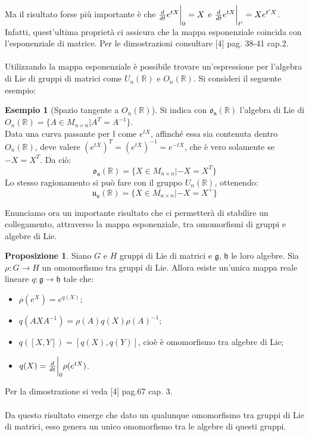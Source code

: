 \documentclass[12pt,a4paper]{report}
\theoremstyle{definition}
\theoremstyle{Theorem}
\newtheorem{Prop}[Def]{Proposizione}
\theoremstyle{definition}
\newtheorem{Ex}[Def]{Esempio}
\theoremstyle{definition}
\theoremstyle{definition}
\begin{document}
Ma il risultato forse più importante è che ${d\over dt}e^{tX}\bigg{\rvert}_0=X$ e ${d\over dt}e^{tX}\bigg{\rvert}_{t'}=Xe^{t'X}$.\\
Infatti, quest'ultima proprietà ci assicura che la mappa esponenziale coincida con l'esponenziale di matrice.
Per le dimostrazioni consultare [4] pag. 38-41 cap.2.\\
\\
Utilizzando la mappa esponenziale è possibile trovare un'espressione per l'algebra di Lie di gruppi di matrici come $U_n(\mathbb{R})$ e $O_n(\mathbb{R})$. Si consideri il seguente esempio:
\begin{Ex}[Spazio tangente a $O_n(\mathbb{R})$]
	Si indica con $\mathfrak{o_n(\mathbb{R})}$ l'algebra di Lie di $O_n(\mathbb{R})=\{A\in M_{n\times n}|A^T=A^{-1}\}$.\\
	Data una curva passante per $\mathbb{I}$ come $e^{tX}$, affinché essa sia contenuta dentro $O_n(\mathbb{R})$, deve valere $(e^{tX})^T=(e^{tX})^{-1}=e^{-tX}$, che è vero solamente se $-X=X^T$. Da ciò: $$\mathfrak{o_n(\mathbb{R})}=\{X\in M_{n\times n}|-X=X^T\}$$
	Lo stesso ragionamento si può fare con il gruppo $U_n(\mathbb{R})$, ottenendo: $$\mathfrak{u_n(\mathbb{R})}=\{X\in M_{n\times n}|-X=X^+\}$$
\end{Ex}
Enunciamo ora un importante risultato che ci permetterà di stabilire un collegamento, attraverso la mappa esponenziale, tra omomorfismi di gruppi e algebre di Lie.
\begin{Prop} \label{Prop: 2.4.1}
	Siano $G$ e $H$ gruppi di Lie di matrici e $\mathfrak{g}$, $\mathfrak{h}$ le loro algebre. Sia $\rho:G\rightarrow H$ un omomorfismo tra gruppi di Lie. Allora esiste un'unica mappa reale lineare $q:\mathfrak{g}\rightarrow\mathfrak{h}$ tale che:
	\begin{itemize}
		\item $\rho(e^X)=e^{q(X)}$; 
		\item $q(AXA^{-1})=\rho(A)q(X)\rho(A)^{-1}$;
		\item $q([X,Y])=[q(X),q(Y)]$, cioè è omomorfismo tra algebre di Lie;
		\item $q(X)={d\over dt}\bigg{\rvert}_0\rho(e^{tX})$.
	\end{itemize}
\end{Prop}
Per la dimostrazione si veda [4] pag.67 cap. 3.\\
\\
Da questo risultato emerge che dato un qualunque omomorfismo tra gruppi di Lie di matrici, esso genera un unico omomorfismo tra le algebre di questi gruppi.
	\newpage
\thispagestyle{empty}
\mbox{}
\newpage
\end{document}
